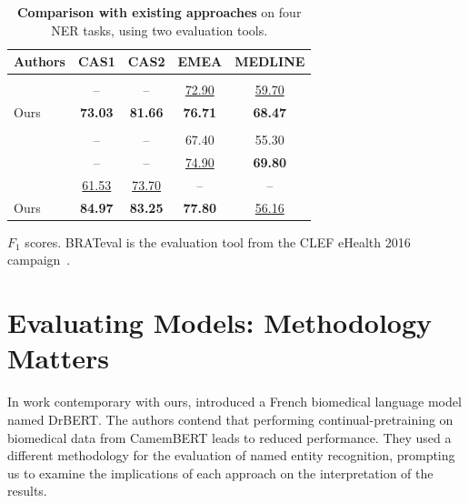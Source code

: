 \begin{table}[t]
\centering
\small
\setlength{\tabcolsep}{4pt}
\begin{threeparttable}[b]
\begin{tabular}{l S[table-format=2.2] S[table-format=2.2] S[table-format=2.2] S[table-format=2.2]}
\toprule
\textbf{Authors} & {\textbf{CAS1}} & {\textbf{CAS2}} & {\textbf{EMEA}} & {\textbf{MEDLINE}} \\
\midrule
{}
 \\[1pt]
\citet{dura_learning_2022} & {--} & {--} & \underline{72.90} & \underline{59.70} \\
Ours & \bfseries 73.03 & \bfseries 81.66 & \bfseries 76.71 & \bfseries 68.47 \\
\midrule
{}
 \\[1pt]
\citet{le_clercq_de_lannoy_strategies_2022} & {--} & {--} & 67.40 & 55.30 \\
\citet{mulligen_erasmus_2016} & {--} & {--} & \underline{74.90} & \bfseries 69.80 \\
\citet{copara_contextualized_2020} & \underline{61.53} & \underline{73.70} & {--} & {--} \\
Ours & \bfseries 84.97 & \bfseries 83.25 & \bfseries 77.80 & \underline{56.16} \\
\bottomrule
\end{tabular}
\begin{tablenotes}
  \small
  \item $F_1$ scores. BRATeval is the evaluation tool from the CLEF eHealth 2016 campaign~\citep{neveol_clinical_2016}.
\end{tablenotes}
\end{threeparttable}
\caption{\textbf{Comparison with existing approaches} on four NER tasks, using two evaluation tools.}
\label{tab:compare}
\end{table}


\section{Evaluating Models: Methodology Matters}

\begin{reviewread}
In work contemporary with ours, \citet{labrak2023drbert} introduced a French biomedical language model named DrBERT. The authors contend that performing continual-pretraining on biomedical data from CamemBERT leads to reduced performance. They used a different methodology for the evaluation of named entity recognition, prompting us to examine the implications of each approach on the interpretation of the results.
\end{reviewread}

